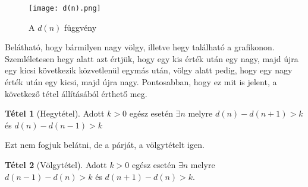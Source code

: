 \documentclass[12pt]{book}
\theoremstyle{plain} %
\theoremstyle{definition} %
\newtheorem{theo/}{Tétel}[section]
\newenvironment{theo}
  {\renewcommand{\qedsymbol}{$\clubsuit$}%
   \pushQED{\qed}\begin{theo/}}
  {\popQED\end{theo/}}
\theoremstyle{remark}
\renewcommand\qedsymbol{$\blacksquare$}
\numberwithin{equation}{section}  %
\begin{document}
	\begin{figure}[h] %
		\centering
		\texttt{[image: d(n).png]}
		\caption{A $d(n)$ függvény}\label{d(n)}
	\end{figure}

	Belátható, hogy bármilyen nagy völgy, illetve hegy található a grafikonon. Szemléletesen hegy alatt azt értjük, hogy egy kis érték után egy nagy, majd újra egy kicsi következik közvetlenül egymás után, völgy alatt pedig, hogy egy nagy érték után egy kicsi, majd újra nagy. Pontosabban, hogy ez mit is jelent, a következő tétel állításából érthető meg.
	
	\begin{theo}[Hegytétel]
		Adott $k>0$ egész esetén $\exists n$ melyre $d(n)-d(n+1) > k$ és $d(n)-d(n-1)>k$
	\end{theo}

	Ezt nem fogjuk belátni, de a párját, a völgytételt igen.
	
	\begin{theo}[Völgytétel]
		Adott $k>0$ egész esetén $\exists n$ melyre $d(n-1)-d(n)>k$ és $d(n+1)-d(n)>k$.
	\end{theo}
\end{document}
